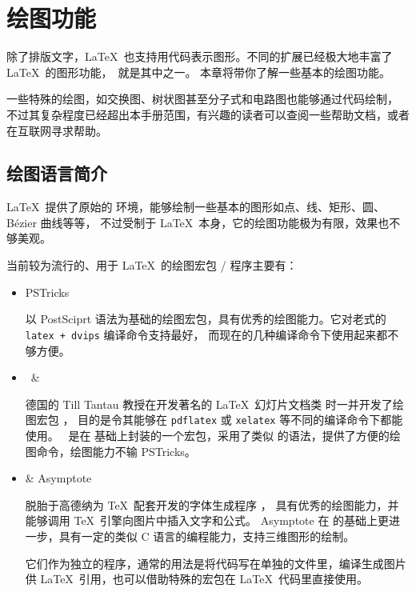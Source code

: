 \chapter{绘图功能}\label{chap:graphics}

\begin{intro}
除了排版文字，\LaTeX\ 也支持用代码表示图形。不同的扩展已经极大地丰富了 \LaTeX\ 的图形功能，\TikZ\ 就是其中之一。
本章将带你了解一些基本的绘图功能。

一些特殊的绘图，如交换图、树状图甚至分子式和电路图也能够通过代码绘制，
不过其复杂程度已经超出本手册范围，有兴趣的读者可以查阅一些帮助文档，或者在互联网寻求帮助。
\end{intro}

\section{绘图语言简介}\label{sec:pict-lang}

\LaTeX\ 提供了原始的  环境，能够绘制一些基本的图形如点、线、矩形、圆、B\'ezier 曲线等等，
不过受制于 \LaTeX\ 本身，它的绘图功能极为有限，效果也不够美观。

当前较为流行的、用于 \LaTeX\ 的绘图宏包 / 程序主要有：
\begin{itemize}
  \item PSTricks \par
  以 PostSciprt 语法为基础的绘图宏包，具有优秀的绘图能力。它对老式的 \texttt{latex + dvips} 编译命令支持最好，
  而现在的几种编译命令下使用起来都不够方便。

  \item \TikZ\ \&  \par
  德国的 Till Tantau 教授在开发著名的 \LaTeX\ 幻灯片文档类  时一并开发了绘图宏包 ，
  目的是令其能够在 \texttt{pdflatex} 或 \texttt{xelatex} 等不同的编译命令下都能使用。
  \TikZ\ 是在  基础上封装的一个宏包，采用了类似  的语法，提供了方便的绘图命令，绘图能力不输 PSTricks。

  \item {} \& Asymptote \par
   脱胎于高德纳为 \TeX\ 配套开发的字体生成程序 ，
  具有优秀的绘图能力，并能够调用 \TeX\ 引擎向图片中插入文字和公式。
  Asymptote 在  的基础上更进一步，具有一定的类似 C 语言的编程能力，支持三维图形的绘制。\par
  它们作为独立的程序，通常的用法是将代码写在单独的文件里，编译生成图片供 \LaTeX\ 引用，也可以借助特殊的宏包在 \LaTeX\ 代码里直接使用。
\end{itemize}

